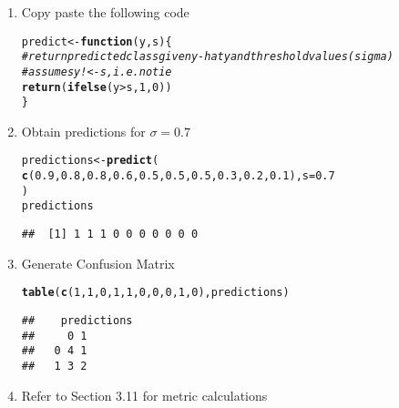 \documentclass[../../dsa1101_notes.Rtex]{subfiles}\usepackage[]{graphicx}\usepackage[]{color}
\makeatletter
\newcommand{\hlnum}[1]{\textcolor[rgb]{0.686,0.059,0.569}{#1}}%
\newcommand{\hlcom}[1]{\textcolor[rgb]{0.678,0.584,0.686}{\textit{#1}}}%
\newcommand{\hlopt}[1]{\textcolor[rgb]{0,0,0}{#1}}%
\newcommand{\hlstd}[1]{\textcolor[rgb]{0.345,0.345,0.345}{#1}}%
\newcommand{\hlkwa}[1]{\textcolor[rgb]{0.161,0.373,0.58}{\textbf{#1}}}%
\newcommand{\hlkwb}[1]{\textcolor[rgb]{0.69,0.353,0.396}{#1}}%
\newcommand{\hlkwc}[1]{\textcolor[rgb]{0.333,0.667,0.333}{#1}}%
\newcommand{\hlkwd}[1]{\textcolor[rgb]{0.737,0.353,0.396}{\textbf{#1}}}%
\newenvironment{kframe}{%
 \def\at@end@of@kframe{}%
 \ifinner\ifhmode%
  \def\at@end@of@kframe{\end{minipage}}%
  \begin{minipage}{\columnwidth}%
 \fi\fi%
 \def\FrameCommand##1{\hskip\@totalleftmargin \hskip-\fboxsep
 \colorbox{shadecolor}{##1}\hskip-\fboxsep
     \hskip-\linewidth \hskip-\@totalleftmargin \hskip\columnwidth}%
 \MakeFramed {\advance\hsize-\width
   \@totalleftmargin\z@ \linewidth\hsize
   \@setminipage}}%
 {\par\unskip\endMakeFramed%
 \at@end@of@kframe}
\newenvironment{knitrout}{}{} %
\makeatother
\begin{document}
\begin{enumerate}
  \item Copy paste the following code
\begin{knitrout}
\color{fgcolor}\begin{kframe}
\begin{alltt}
\hlstd{predict} \hlkwb{<-} \hlkwa{function}\hlstd{(}\hlkwc{y}\hlstd{,} \hlkwc{s}\hlstd{) \{}
  \hlcom{# return predicted class given y-hat y and threshold value s (sigma)}
  \hlcom{# assumes y !<- s, i.e. no tie}
  \hlkwd{return} \hlstd{(}\hlkwd{ifelse}\hlstd{(y} \hlopt{>} \hlstd{s,} \hlnum{1}\hlstd{,} \hlnum{0}\hlstd{))}
\hlstd{\}}
\end{alltt}
\end{kframe}
\end{knitrout}
  \item Obtain predictions for \(\sigma=0.7\)
\begin{knitrout}
\color{fgcolor}\begin{kframe}
\begin{alltt}
\hlstd{predictions} \hlkwb{<-} \hlkwd{predict}\hlstd{(}
  \hlkwd{c}\hlstd{(}\hlnum{0.9}\hlstd{,} \hlnum{0.8}\hlstd{,} \hlnum{0.8}\hlstd{,} \hlnum{0.6}\hlstd{,} \hlnum{0.5}\hlstd{,} \hlnum{0.5}\hlstd{,} \hlnum{0.5}\hlstd{,} \hlnum{0.3}\hlstd{,} \hlnum{0.2}\hlstd{,} \hlnum{0.1}\hlstd{),} \hlkwc{s}\hlstd{=}\hlnum{0.7}
\hlstd{)}
\hlstd{predictions}
\end{alltt}
\begin{verbatim}
##  [1] 1 1 1 0 0 0 0 0 0 0
\end{verbatim}
\end{kframe}
\end{knitrout}
  \item Generate Confusion Matrix
\begin{knitrout}
\color{fgcolor}\begin{kframe}
\begin{alltt}
\hlkwd{table}\hlstd{(}\hlkwd{c}\hlstd{(}\hlnum{1}\hlstd{,} \hlnum{1}\hlstd{,} \hlnum{0}\hlstd{,} \hlnum{1}\hlstd{,} \hlnum{1}\hlstd{,} \hlnum{0}\hlstd{,} \hlnum{0}\hlstd{,} \hlnum{0}\hlstd{,} \hlnum{1}\hlstd{,} \hlnum{0}\hlstd{), predictions)}
\end{alltt}
\begin{verbatim}
##    predictions
##     0 1
##   0 4 1
##   1 3 2
\end{verbatim}
\end{kframe}
\end{knitrout}
  \item Refer to Section 3.11 for metric calculations
\end{enumerate}
\end{document}
